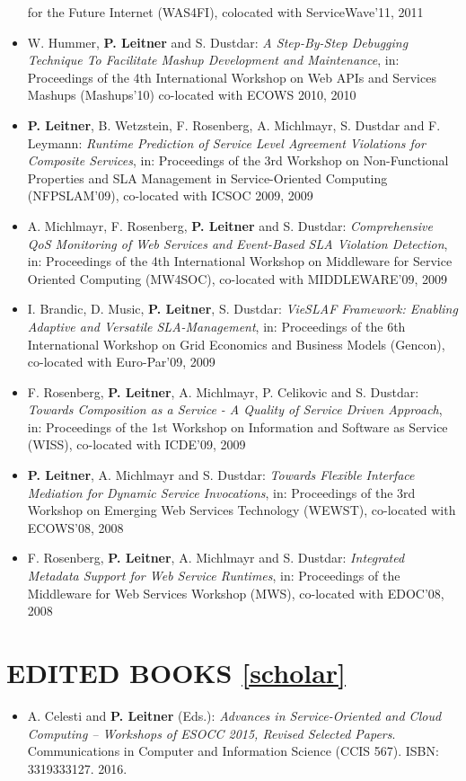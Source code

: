 \documentclass[paper=letter,fontsize=11pt]{scrartcl} %
\newcommand{\NewPart}[2]{\section*{\uppercase{#1} #2}}
\begin{document}
\begin{itemize}
for the Future Internet (WAS4FI), colocated with ServiceWave'11, 2011
\item W. Hummer, \textbf{P. Leitner} and S. Dustdar: \emph{A Step-By-Step Debugging Technique To Facilitate Mashup Development and Maintenance}, in: Proceedings of the 4th International Workshop on Web APIs and Services Mashups (Mashups'10) co-located with ECOWS 2010, 2010
\item \textbf{P. Leitner}, B. Wetzstein, F. Rosenberg, A. Michlmayr, S. Dustdar and F. Leymann: \emph{Runtime Prediction of Service Level Agreement Violations for Composite Services}, in: Proceedings of the 3rd Workshop on Non-Functional Properties and SLA Management in Service-Oriented Computing (NFPSLAM'09), co-located with ICSOC 2009, 2009
\item A. Michlmayr, F. Rosenberg, \textbf{P. Leitner} and S. Dustdar: \emph{Comprehensive QoS Monitoring of Web Services and Event-Based SLA Violation Detection}, in: Proceedings of the 4th International Workshop on Middleware for Service Oriented Computing (MW4SOC), co-located with MIDDLEWARE'09, 2009
\item I. Brandic, D. Music, \textbf{P. Leitner}, S. Dustdar: \emph{VieSLAF Framework: Enabling Adaptive and Versatile SLA-Management}, in: Proceedings of the 6th International Workshop on Grid Economics and Business Models (Gencon), co-located with Euro-Par'09, 2009
\item F. Rosenberg, \textbf{P. Leitner}, A. Michlmayr, P. Celikovic and S. Dustdar: \emph{Towards Composition as a Service - A Quality of Service Driven Approach}, in: Proceedings of the 1st Workshop on Information and Software as Service (WISS), co-located with ICDE'09, 2009
\item \textbf{P. Leitner}, A. Michlmayr and S. Dustdar: \emph{Towards Flexible Interface Mediation for Dynamic Service Invocations}, in: Proceedings of the 3rd Workshop on Emerging Web Services Technology (WEWST), co-located with ECOWS'08, 2008
\item F. Rosenberg, \textbf{P. Leitner}, A. Michlmayr and S. Dustdar: \emph{Integrated Metadata Support for Web Service Runtimes}, in: Proceedings of the Middleware for Web Services Workshop (MWS), co-located with EDOC'08, 2008
\end{itemize}

\NewPart{Edited Books}{\href{https://scholar.google.ch/citations?user=wZ9f8CAAAAAJ}{[scholar]}}

\begin{itemize}
	\item A. Celesti and \textbf{P. Leitner} (Eds.): \emph{Advances in
  Service-Oriented and Cloud Computing -- Workshops of ESOCC 2015, Revised Selected Papers}.
Communications in Computer and Information Science (CCIS 567). ISBN: 3319333127. 2016.

\end{itemize}
\end{document}
